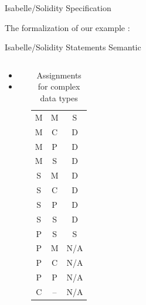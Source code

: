 \documentclass[aspectratio=169]{beamer}
\begin{document}
\begin{frame}{Isabelle/Solidity Specification}

\begin{Example}{}{}
	The formalization of our example :
	\begin{center}
	\end{center}
\end{Example}
\end{frame}
\begin{frame}{Isabelle/Solidity Statements Semantic}
\begin{columns}

\begin{itemize}
\item 
\item
\end{itemize}

\begin{table}[]

\caption{Assignments for complex data types}\label{tab:assign}

\begin{tabular}{ccc}
 M& M & S \\
M &  C&  D   \\
 M&  P&  D \\
M &  S&  D\\
S & M&   D\\
S & C&   D\\
S & P&   D\\
S & S& D\\
P& S& S\\
P&M&N/A\\
P&C&N/A\\
P&P&N/A\\
C&--&N/A
\end{tabular}
\end{table}
\end{columns}
\end{frame}
\end{document}
